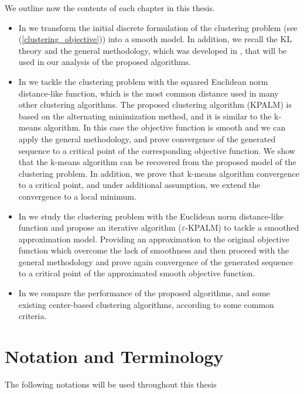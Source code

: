 We outline now the contents of each chapter in this thesis.
\begin{itemize}
	\item In  we transform the initial discrete formulation  of the clustering problem (see (\ref{clustering_objective})) into a smooth model. In addition, we recall the KL theory and the general methodology, which was developed in \cite{BST2014}, that will be used in our analysis of the proposed algorithms.
	\item In  we tackle the clustering problem with the squared Euclidean norm distance-like function, which is the most common distance used in many other clustering algorithms. The proposed clustering algorithm (KPALM) is based on the alternating minimization method, and it is similar to the k-means algorithm. In this case the objective function is smooth and we can apply the general methodology, and prove convergence of the generated sequence to a critical point of the corresponding objective function. We show that the k-means algorithm can be recovered from the proposed model of the clustering problem. In addition, we prove that k-means algorithm convergence to a critical point, and under additional assumption, we extend the convergence to a local minimum.
	\item In  we study the clustering problem with the Euclidean norm distance-like function and propose an iterative algorithm ($\varepsilon$-KPALM) to tackle a smoothed approximation model. Providing an approximation to the original objective function which overcome the lack of smoothness and then proceed with the general methodology and prove again convergence of the generated sequence to a critical point of the approximated smooth objective function.
	\item In  we compare the performance of the proposed algorithms, and some existing center-based clustering algorithms, according to some common criteria.
\end{itemize}

\clearpage
\section{Notation and Terminology}

The following notations will be used throughout this thesis

